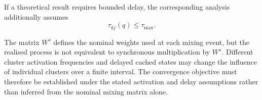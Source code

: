\documentclass[pdflatex,sn-mathphys-num]{sn-jnl}
\begin{document}
If a theoretical result requires bounded delay, the corresponding analysis additionally assumes
\[
\tau_{kj}(q)
\leq
\tau_{\max}.
\]

The matrix \(W^s\) defines the nominal weights used at each mixing event, but the realised process is not equivalent to synchronous multiplication by \(W^s\). Different cluster activation frequencies and delayed cached states may change the influence of individual clusters over a finite interval. The convergence objective must therefore be established under the stated activation and delay assumptions rather than inferred from the nominal mixing matrix alone.













\end{document}
